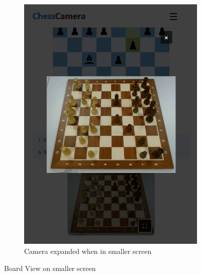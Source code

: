 \begin{figure}[h!]
\begin{subfigure}[h!]{0.4\linewidth}
        \includegraphics[width=\linewidth]{figures/results/frontend/board-view/camera-fullscreen-mobile.png}
        \caption{Camera expanded when in smaller screen}
        \label{fig:small-board-view-camera-expanded}
    \end{subfigure}
    \caption{Board View on smaller screen}
    \label{fig:small-view-board-view-group}
\end{figure}
